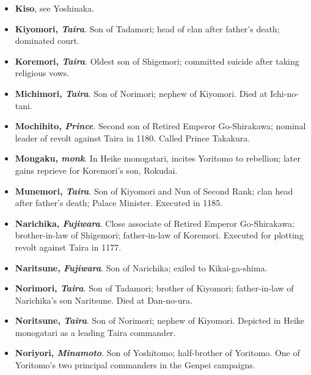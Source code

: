 \documentclass{article}
\begin{document}
\begin{small}
\begin{itemize}[
            label=,
            leftmargin=0em,
            itemindent=-2em,
            nosep,
        ]
        \item \textbf{Kiso}, see Yoshinaka.

        \item \textbf{Kiyomori, \textit{Taira}}. Son of Tadamori; head of clan after father’s death; dominated court.

        \item \textbf{Koremori, \textit{Taira}}. Oldest son of Shigemori; committed suicide after taking religious vows.

        \item \textbf{Michimori, \textit{Taira}}. Son of Norimori; nephew of Kiyomori. Died at Ichi-no-tani.

        \item \textbf{Mochihito, \textit{Prince}}. Second son of Retired Emperor Go-Shirakawa; nominal leader of revolt against Taira in 1180. Called Prince Takakura.

        \item \textbf{Mongaku, \textit{monk}}. In Heike monogatari, incites Yoritomo to rebellion; later gains reprieve for Koremori’s son, Rokudai.

        \item \textbf{Munemori, \textit{Taira}}. Son of Kiyomori and Nun of Second Rank; clan head after father’s death; Palace Minister. Executed in 1185.

        \item \textbf{Narichika, \textit{Fujiwara}}. Close associate of Retired Emperor Go-Shirakawa; brother-in-law of Shigemori; father-in-law of Koremori. Executed for plotting revolt against Taira in 1177.

        \item \textbf{Naritsune, \textit{Fujiwara}}. Son of Narichika; exiled to Kikai-ga-shima.

        \item \textbf{Norimori, \textit{Taira}}. Son of Tadamori; brother of Kiyomori; father-in-law of Narichika’s son Naritsune. Died at Dan-no-ura.

        \item \textbf{Noritsune, \textit{Taira}}. Son of Norimori; nephew of Kiyomori. Depicted in Heike monogatari as a leading Taira commander.

        \item \textbf{Noriyori, \textit{Minamoto}}. Son of Yoshitomo; half-brother of Yoritomo. One of Yoritomo’s two principal commanders in the Genpei campaigns.


\end{itemize}
\end{small}
\end{document}
